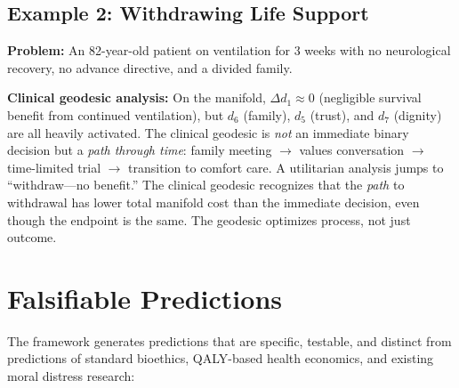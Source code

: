 \documentclass[12pt]{article}
\theoremstyle{definition}
\theoremstyle{remark}
\begin{document}
\subsection{Example 2: Withdrawing Life Support}

\textbf{Problem:} An 82-year-old patient on ventilation for 3 weeks with no neurological recovery, no advance directive, and a divided family.

\textbf{Clinical geodesic analysis:}  On the manifold, $\Delta d_1 \approx 0$ (negligible survival benefit from continued ventilation), but $d_6$ (family), $d_5$ (trust), and $d_7$ (dignity) are all heavily activated.  The clinical geodesic is \emph{not} an immediate binary decision but a \emph{path through time}: family meeting $\to$ values conversation $\to$ time-limited trial $\to$ transition to comfort care.  A utilitarian analysis jumps to ``withdraw---no benefit.''  The clinical geodesic recognizes that the \emph{path} to withdrawal has lower total manifold cost than the immediate decision, even though the endpoint is the same.  The geodesic optimizes process, not just outcome.

\section{Falsifiable Predictions}
\label{sec:predictions}

The framework generates predictions that are specific, testable, and distinct from predictions of standard bioethics, QALY-based health economics, and existing moral distress research:
\end{document}
